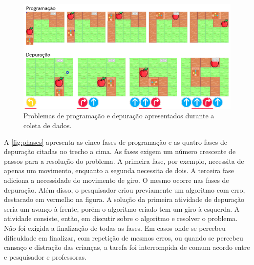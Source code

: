 \begin{figure}[!ht]
    \centering
    \includegraphics[width=.8\linewidth,fbox]{figs/phases.png}
    \caption{Problemas de programação e depuração apresentados durante a coleta de dados. }
    \sourceauthor
    \label{fig:phases}
\end{figure}

A \autoref{fig:phases} apresenta as cinco fases de programação e as quatro fases de depuração citadas no trecho a cima. As fases exigem um número crescente de passos para a resolução do problema. A primeira fase, por exemplo, necessita de apenas um movimento, enquanto a segunda necessita de dois. A terceira fase adiciona a necessidade do movimento de giro. O mesmo ocorre nas fases de depuração. Além disso, o pesquisador criou previamente um algoritmo com erro, destacado em vermelho na figura. A solução da primeira atividade de depuração seria um avanço à frente, porém o algoritmo criado tem um giro à esquerda. A atividade consiste, então, em discutir sobre o algoritmo e resolver o problema. Não foi exigida a finalização de todas as fases. Em casos onde se percebeu dificuldade em finalizar, com repetição de mesmos erros, ou quando se percebeu cansaço e distração das crianças, a tarefa foi interrompida de comum acordo entre e pesquisador e professoras.


